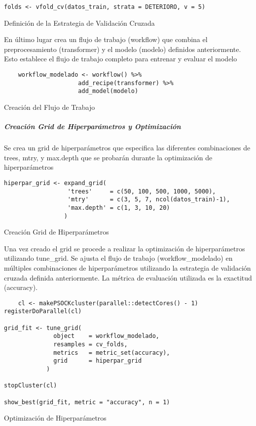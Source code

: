 \begin{code}[H]
\begin{lstlisting}[style=mystyle]
    folds <- vfold_cv(datos_train, strata = DETERIORO, v = 5)
\end{lstlisting}
\caption{Definición de la Estrategia de Validación Cruzada}
\label{code:Definición de la Estrategia de Validación Cruzada}
\end{code}

En último lugar crea un flujo de trabajo (workflow) que combina el preprocesamiento (transformer) y el modelo (modelo) definidos anteriormente. Esto establece el flujo de trabajo completo para entrenar y evaluar el modelo

\begin{code}[H]
\begin{lstlisting}
    workflow_modelado <- workflow() %>%
                     add_recipe(transformer) %>%
                     add_model(modelo)
\end{lstlisting}
\caption{Creación del Flujo de Trabajo}
\label{code:Creación del Flujo de Trabajo}
\end{code}

\subparagraph{Creación Grid de Hiperparámetros y Optimización}

Se crea un grid de hiperparámetros que especifica las diferentes combinaciones de trees, mtry, y max.depth que se probarán durante la optimización de hiperparámetros

\begin{code}[H]
\begin{lstlisting}[style=mystyle]
    hiperpar_grid <- expand_grid(
                  'trees'     = c(50, 100, 500, 1000, 5000),
                  'mtry'      = c(3, 5, 7, ncol(datos_train)-1),
                  'max.depth' = c(1, 3, 10, 20)
                 )
\end{lstlisting}
\caption{Creación Grid de Hiperparámetros}
\label{code:Creación Grid de Hiperparámetros}
\end{code}

Una vez creado el grid se procede a realizar la optimización de hiperparámetros utilizando tune\_grid. Se ajusta el flujo de trabajo (workflow\_modelado) en múltiples combinaciones de hiperparámetros utilizando la estrategia de validación cruzada definida anteriormente. La métrica de evaluación utilizada es la exactitud (accuracy). 

\begin{code}[H]
\begin{lstlisting}
    cl <- makePSOCKcluster(parallel::detectCores() - 1)
registerDoParallel(cl)

grid_fit <- tune_grid(
              object    = workflow_modelado,
              resamples = cv_folds,
              metrics   = metric_set(accuracy),
              grid      = hiperpar_grid
            )

stopCluster(cl)

show_best(grid_fit, metric = "accuracy", n = 1)
\end{lstlisting}
\caption{Optimización de Hiperparámetros}
\label{code:Optimización de Hiperparámetros}
\end{code}


